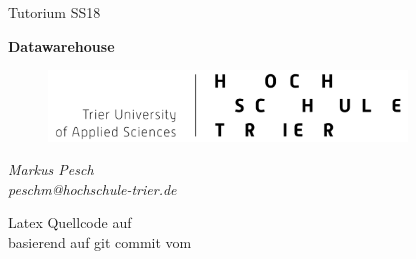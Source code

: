 \begin{titlepage}
  \begin{center}
    \begin{large}
      Tutorium SS18
    \end{large}
    
    \begin{huge}
      \begin{singlespace}
            \textbf{Datawarehouse}
      \end{singlespace}
    \end{huge}

    \vspace{0.5cm}

    \begin{figure}[h]
      \centering
      \includegraphics[width=0.85\textwidth]{img//logo.png}
      \label{img:fh-trier-logo}
    \end{figure}

    \vspace{2cm}
    \begin{large}
      \textit{Markus Pesch} \\
      \textit{peschm@hochschule-trier.de}
    \end{large}
    \vspace{2cm}
    
    Latex Quellcode auf  \\
    basierend auf git commit  vom 
    
    
  \end{center}
\end{titlepage}
